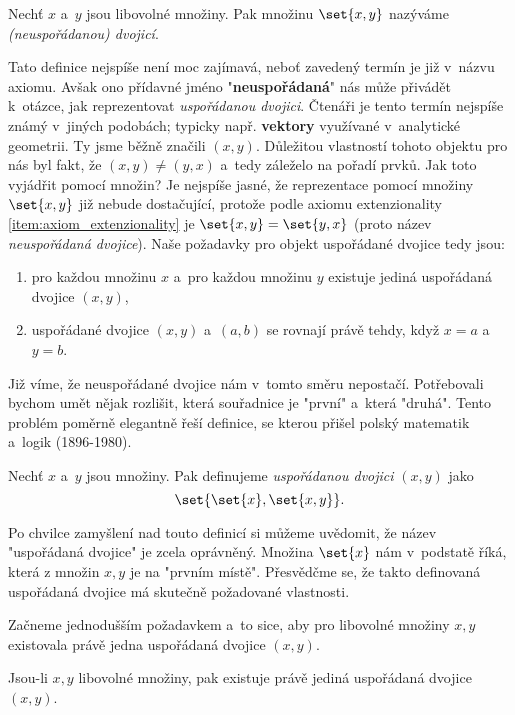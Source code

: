 \begin{definition}[Dvojice]
    Nechť $x$ a~$y$ jsou libovolné množiny. Pak množinu $\set{x,y}$ nazýváme \emph{(neuspořádanou) dvojicí}.
\end{definition}
Tato definice nejspíše není moc zajímavá, neboť zavedený termín je již v~názvu axiomu. Avšak ono přídavné jméno "\textbf{neuspořádaná}" nás může přivádět k~otázce, jak reprezentovat \emph{uspořádanou dvojici}. Čtenáři je tento termín nejspíše známý v~jiných podobách; typicky např. \textbf{vektory} využívané v~analytické geometrii. Ty jsme běžně značili $(x,y)$. Důležitou vlastností tohoto objektu pro nás byl fakt, že $(x,y)\neq (y,x)$ a~tedy záleželo na pořadí prvků. Jak toto vyjádřit pomocí množin? Je nejspíše jasné, že reprezentace pomocí množiny $\set{x,y}$ již nebude dostačující, protože podle axiomu extenzionality \ref{item:axiom_extenzionality} je $\set{x,y}=\set{y,x}$ (proto název \emph{neuspořádaná dvojice}). Naše požadavky pro objekt uspořádané dvojice tedy jsou:
\begin{enumerate}
    \item pro každou množinu $x$ a~pro každou množinu $y$ existuje jediná uspořádaná dvojice $(x,y)$,
    \item uspořádané dvojice $(x,y)$ a~$(a,b)$ se rovnají právě tehdy, když $x=a$ a~$y=b$.
\end{enumerate}
Již víme, že neuspořádané dvojice nám v~tomto směru nepostačí. Potřebovali bychom umět nějak rozlišit, která souřadnice je "první" a~která "druhá". Tento problém poměrně elegantně řeší definice, se kterou přišel polský matematik a~logik  \mbox{(1896-1980)}.
\begin{definition}\label{def:usporadana_dvojice}
    Nechť $x$ a~$y$ jsou množiny. Pak definujeme \emph{uspořádanou dvojici} $(x,y)$ jako
    \begin{equation*}
        \set{\set{x},\set{x,y}}.
    \end{equation*}
\end{definition}
Po chvilce zamyšlení nad touto definicí si můžeme uvědomit, že název "uspořádaná dvojice" je zcela oprávněný. Množina $\set{x}$ nám v~podstatě  říká, která z množin $x,y$ je na "prvním místě". Přesvědčme se, že takto definovaná uspořádaná dvojice má skutečně požadované vlastnosti.\par
Začneme jednodušším požadavkem a~to sice, aby pro libovolné množiny $x,y$ existovala právě jedna uspořádaná dvojice $(x,y)$.
\begin{lemma}
    Jsou-li $x,y$ libovolné množiny, pak existuje právě jediná uspořádaná dvojice $(x,y)$.
\end{lemma}
